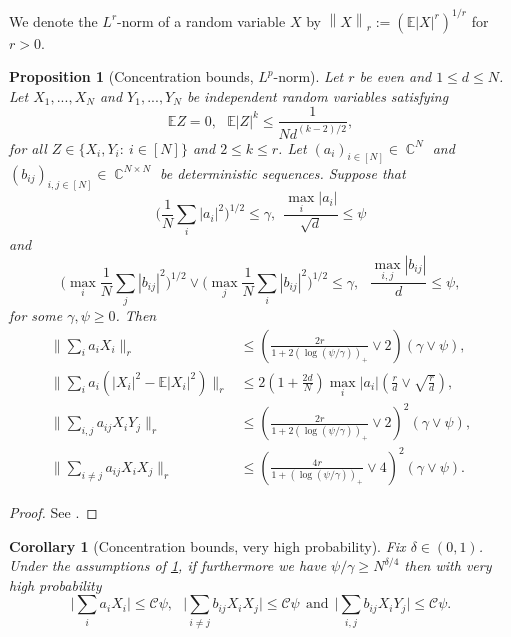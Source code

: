 \documentclass[11pt]{article}
\DeclareMathOperator{\CC}{\mathbb{C}}
\newcommand{\abs}[1]{\left| #1 \right|}
\newcommand{\absbb}[1]{\biggl| #1 \biggr|}
\newcommand{\norm}[1]{\left\| #1 \right\|}
\newcommand{\normbb}[1]{\biggl\| #1 \biggr\|}
\newcommand{\E}{\mathbb{E}}
\theoremstyle{plain}
\newtheorem{prop}{Proposition}[section]
\newtheorem{corollary}{Corollary}[section]
\theoremstyle{remark}
\numberwithin{equation}{section}
\begin{document}
	We denote the $L^r$-norm of a random variable $X$ by $\norm{X}_r:= ( \E \abs{X}^r)^{1/r}$ for $r >0$.  
	\begin{prop}[Concentration bounds, $L^p$-norm]\label{prop:lardev}
		Let $r$ be even and $1 \le d \le N$. Let $X_1,...,X_{N}$ and $Y_1,...,Y_N$ be independent random variables satisfying
		\begin{equation*}\label{eq:condiXYconcentration}
			\mathbb{E}Z  =0, ~~~ \mathbb{E}  \abs{Z}^k  \le \frac{1}{N d^{(k-2)/2}},
		\end{equation*}
		for all $Z \in \{X_i,Y_i:~ i \in [N]\}$ and $2 \le k \le r$. Let $(a_{i})_{i \in [N]} \in \CC^N$ and $(b_{ij})_{i,j \in [N]} \in \CC^{N \times N}$ be deterministic sequences. Suppose that
		\begin{equation*}
			\bigg( \frac{1}{N} \sum_{i} \abs{a_i}^2\bigg)^{1/2} \le \gamma,~~ \frac{\max_i \abs{a_i}}{\sqrt{d}} \le \psi
		\end{equation*}
		and 
		\begin{equation*}
			\bigg( \max_{i} \frac{1}{N} \sum_j \left|b_{ij}\right|^2 \bigg)^{1/2} \vee \bigg( \max_{j} \frac{1}{N} \sum_i \left|b_{ij}\right|^2 \bigg)^{1/2} \le \gamma, ~~~ \frac{\max_{i,j} \left|b_{ij}\right|}{d} \le \psi,
		\end{equation*}
		for some $\gamma, \psi \ge 0$. Then
		\begin{align}
			\normbb{\sum_{i}a_i X_i}_{r} &\le \left( \frac{2r}{1+ 2(\log(\psi/\gamma))_{+}} \vee 2 \right) (\gamma \vee \psi),\label{eq:sumaiXi}\\
			\normbb{\sum_{i}a_i \left(\abs{X_i}^2  - \mathbb{E}\abs{X_{i}}^2\right) }_{r} &\le 2\left( 1+  \frac{2d}{N} \right) \max_{i} |a_i|\left( \frac{r}{d} \vee \sqrt{\frac{r}{d}} \right),\label{eq:sumaiXi2}\\
			\normbb{\sum_{i,j} a_{ij}X_i Y_j}_{r} &\le  \left( \frac{2r}{1+ 2(\log(\psi/\gamma))_{+}} \vee 2 \right)^2 (\gamma \vee \psi),\label{eq:sumaijXiYj}\\
			\normbb{\sum_{i\neq j} a_{ij}X_i X_j}_{r} &\le  \left( \frac{4r}{1+ (\log(\psi/\gamma))_{+}} \vee 4 \right)^2 (\gamma \vee \psi).\label{eq:sumaijXiXj}
		\end{align}
	\end{prop}
	\begin{proof}
		See \cite[Proposition 3.1, Proposition 3.2, Proposition 3.3, Proposition 3.5]{MR4021251}.
	\end{proof}
	\begin{corollary}[Concentration bounds, very high probability] \label{lemma:dev1}
		Fix $\delta \in (0,1)$. Under the assumptions of \cref{prop:lardev}, if furthermore we have $\psi/ \gamma \ge N^{\delta/ 4}$ then with very high probability
		\begin{equation*}
			\absbb{ \sum_{i} a_i X_{i}} \le \mathcal{C} \psi,~~~\absbb{ \sum_{i  \neq  j} b_{ij} X_{i}X_{j}} \le \mathcal{C} \psi ~~ \text{and} ~~  \absbb{\sum_{i,j} b_{ij} X_i Y_j} \leq \mathcal C \psi. 
		\end{equation*}
	\end{corollary}
\end{document}
